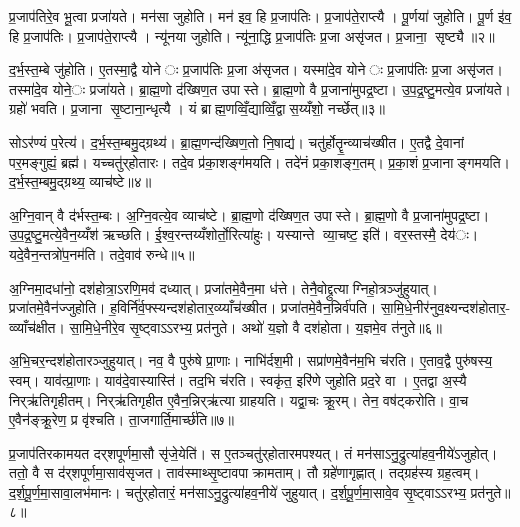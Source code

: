 प्र॒जाप॑तिरे॒व भू॒त्वा प्रजा॑यते। मन॑सा जुहोति। मन॑ इव॒ हि प्र॒जाप॑तिः। प्र॒जाप॑ते॒राप्त्यै। पू॒र्णया॑ जुहोति। पू॒र्ण इ॑व॒ हि प्र॒जाप॑तिः। प्र॒जाप॑ते॒राप्त्यै। न्यू॑नया जुहोति। न्यू॑ना॒द्धि प्र॒जाप॑तिः प्र॒जा असृ॑जत। प्र॒जाना॒ सृष्ट्यै॥२॥

द॒र्भ॒स्त॒म्बे जु॑होति। ए॒तस्मा॒द्वै योनेः प्र॒जाप॑तिः प्र॒जा अ॑सृजत। यस्मा॑दे॒व योनेः प्र॒जाप॑तिः प्र॒जा असृ॑जत। तस्मा॑दे॒व योने॒ः प्रजा॑यते। ब्रा॒ह्म॒णो द॑ख्षिण॒त उपास्ते। ब्रा॒ह्म॒णो वै प्र॒जाना॑मुपद्र॒ष्टा। उ॒प॒द्र॒ष्टु॒मत्ये॒व प्रजा॑यते। ग्रहो॑ भवति। प्र॒जाना सृ॒ष्टाना॒न्धृत्यै। यं ब्राह्म॒णव्विँ॒द्याव्विँ॒द्वास॒य्यँशो॒ नर्च्छेत्॥३॥

सोऽर॑ण्यं प॒रेत्य॑। द॒र्भ॒स्त॒म्बमु॒द्ग्रथ्य॑। ब्रा॒ह्म॒णन्द॑ख्षिण॒तो नि॒षाद्य॑। चतु॑र्होतॄ॒न्व्याच॑ख्षीत। ए॒तद्वै दे॒वानां पर॒मङ्गुह्यं॒ ब्रह्म॑। यच्चतु॑र्‌होतारः। तदे॒व प्र॑का॒शङ्ग॑मयति। तदे॑नं प्रका॒शङ्ग॒तम्। प्र॒का॒शं प्र॒जानाङ्गमयति। द॒र्भ॒स्त॒म्बमु॒द्ग्रथ्य॒ व्याच॑ष्टे॥४॥

अ॒ग्नि॒वान् वै द॑र्भस्त॒म्बः। अ॒ग्नि॒वत्ये॒व व्याच॑ष्टे। ब्रा॒ह्म॒णो द॑ख्षिण॒त उपास्ते। ब्रा॒ह्म॒णो वै प्र॒जाना॑मुपद्र॒ष्टा। उ॒प॒द्र॒ष्टु॒मत्ये॒वैन॒य्यँश॑ ऋच्छति। ई॒श्व॒रन्तय्यँशोर्तो॒रित्या॑हुः। यस्यान्ते व्या॒चष्ट॒ इति॑। वर॒स्तस्मै॒ देय॑ः। यदे॒वैन॒न्तत्रो॑प॒नम॑ति। तदे॒वाव॑ रुन्धे॥५॥

अ॒ग्निमा॒दधा॑नो॒ दश॑होत्रा॒ऽरणि॒मव॑ दध्यात्। प्रजा॑तमे॒वैन॒मा ध॑त्ते। तेनै॒वोद्द्रुत्याग्निहो॒त्रञ्जु॑हुयात्। प्रजा॑तमे॒वैन॑ज्जुहोति। ह॒विर्नि॑र्व॒फ्स्यन्दश॑होतार॒व्य्याँच॑ख्षीत। प्रजा॑तमे॒वैन॒न्निर्व॑पति। सा॒मि॒धे॒नीर॑नुव॒क्ष्यन्दश॑होतार॒- व्व्याँच॑क्षीत। सा॒मि॒धे॒नीरे॒व सृ॒ष्ट्वाऽऽरभ्य॒ प्रत॑नुते। अथो॑ य॒ज्ञो वै दश॑होता। य॒ज्ञमे॒व त॑नुते॥६॥

अ॒भि॒चर॒न्दश॑होतारञ्जुहुयात्। नव॒ वै पुरु॑षे प्रा॒णाः। नाभि॑र्दश॒मी। सप्रा॑णमे॒वैन॑म॒भि च॑रति। ए॒ताव॒द्वै पुरु॑षस्य॒ स्वम्। याव॑त्प्रा॒णाः। याव॑दे॒वास्यास्ति॑। तद॒भि च॑रति। स्वकृ॑त॒ इरि॑णे जुहोति प्रद॒रे वा। ए॒तद्वा अ॒स्यै निर्‌ऋ॑तिगृहीतम्। निर्‌ऋ॑तिगृहीत ए॒वैन॒न्निर्‌ऋ॑त्या ग्राहयति। यद्वा॒चः क्रू॒रम्। तेन॒ वष॑ट्करोति। वा॒च ए॒वैन॑ङ्क्रू॒रेण॒ प्र वृ॑श्चति। ता॒जगार्ति॒मार्च्छ॑ति॥७॥


प्र॒जाप॑तिरकामयत दर्‌शपूर्णमा॒सौ सृ॑जे॒येति॑। स ए॒तञ्चतु॑र्‌होतारमपश्यत्। तं मन॑साऽनु॒द्रुत्या॑हव॒नीये॑ऽजुहोत्। ततो॒ वै स द॑र्‌शपूर्णमा॒साव॑सृजत। ताव॑स्माथ्सृ॒ष्टावपाक्रामताम्। तौ ग्रहे॑णागृह्णात्। तद्ग्रह॑स्य ग्रह॒त्वम्। द॒र्श॒पू॒र्ण॒मा॒सावा॒लभ॑मानः। चतु॑र्‌होतारं॒ मन॑साऽनु॒द्रुत्या॑हव॒नीये॑ जुहुयात्। द॒र्श॒पू॒र्ण॒मा॒सावे॒व सृ॒ष्ट्वाऽऽरभ्य॒ प्रत॑नुते॥८॥

